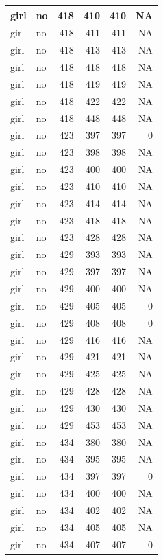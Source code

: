 \documentclass[man]{apa6}
\begin{document}
\begin{tabular}{l|l|r|r|r|r}
\hline
girl & no & 418 & 410 & 410 & NA\\
\hline
girl & no & 418 & 411 & 411 & NA\\
\hline
girl & no & 418 & 413 & 413 & NA\\
\hline
girl & no & 418 & 418 & 418 & NA\\
\hline
girl & no & 418 & 419 & 419 & NA\\
\hline
girl & no & 418 & 422 & 422 & NA\\
\hline
girl & no & 418 & 448 & 448 & NA\\
\hline
girl & no & 423 & 397 & 397 & 0\\
\hline
girl & no & 423 & 398 & 398 & NA\\
\hline
girl & no & 423 & 400 & 400 & NA\\
\hline
girl & no & 423 & 410 & 410 & NA\\
\hline
girl & no & 423 & 414 & 414 & NA\\
\hline
girl & no & 423 & 418 & 418 & NA\\
\hline
girl & no & 423 & 428 & 428 & NA\\
\hline
girl & no & 429 & 393 & 393 & NA\\
\hline
girl & no & 429 & 397 & 397 & NA\\
\hline
girl & no & 429 & 400 & 400 & NA\\
\hline
girl & no & 429 & 405 & 405 & 0\\
\hline
girl & no & 429 & 408 & 408 & 0\\
\hline
girl & no & 429 & 416 & 416 & NA\\
\hline
girl & no & 429 & 421 & 421 & NA\\
\hline
girl & no & 429 & 425 & 425 & NA\\
\hline
girl & no & 429 & 428 & 428 & NA\\
\hline
girl & no & 429 & 430 & 430 & NA\\
\hline
girl & no & 429 & 453 & 453 & NA\\
\hline
girl & no & 434 & 380 & 380 & NA\\
\hline
girl & no & 434 & 395 & 395 & NA\\
\hline
girl & no & 434 & 397 & 397 & 0\\
\hline
girl & no & 434 & 400 & 400 & NA\\
\hline
girl & no & 434 & 402 & 402 & NA\\
\hline
girl & no & 434 & 405 & 405 & NA\\
\hline
girl & no & 434 & 407 & 407 & 0\\

\end{tabular}
\end{document}

